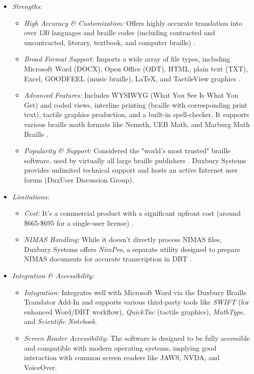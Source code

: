 \begin{itemize}
    \item \emph{Strengths:}
    \begin{itemize}
        \item \emph{High Accuracy \& Customization:} Offers highly accurate translation into over 130 languages and braille codes (including contracted and uncontracted, literary, textbook, and computer braille) \cite{DBTWebsite}.
        \item \emph{Broad Format Support:} Imports a wide array of file types, including Microsoft Word (DOCX), Open Office (ODT), HTML, plain text (TXT), Excel, GOODFEEL (music braille), LaTeX, and TactileView graphics \cite{VisionAidDBT}.
        \item \emph{Advanced Features:} Includes WYSIWYG (What You See Is What You Get) and coded views, interline printing (braille with corresponding print text), tactile graphics production, and a built-in spell-checker. It supports various braille math formats like Nemeth, UEB Math, and Marburg Math Braille \cite{DuxburySystems}.
        \item \emph{Popularity \& Support:} Considered the "world's most trusted" braille software, used by virtually all large braille publishers \cite{DuxburySystems}. Duxbury Systems provides unlimited technical support and hosts an active Internet user forum (DuxUser Discussion Group).
    \end{itemize}
    \item \emph{Limitations:}
    \begin{itemize}
        \item \emph{Cost:} It's a commercial product with a significant upfront cost (around \$665-\$695 for a single-user license) \cite{BlindHelpDBT}.
        \item \emph{NIMAS Handling:} While it doesn't directly process NIMAS files, Duxbury Systems offers \emph{NimPro}, a separate utility designed to prepare NIMAS documents for accurate transcription in DBT \cite{DuxburyProducts}.
    \end{itemize}
    \item \emph{Integration \& Accessibility:}
    \begin{itemize}
        \item \emph{Integration:} Integrates well with Microsoft Word via the Duxbury Braille Translator Add-In and supports various third-party tools like \emph{SWIFT} (for enhanced Word/DBT workflow), \emph{QuickTac} (tactile graphics), \emph{MathType}, and \emph{Scientific Notebook}.
        \item \emph{Screen Reader Accessibility:} The software is designed to be fully accessible and compatible with modern operating systems, implying good interaction with common screen readers like JAWS, NVDA, and VoiceOver.
    \end{itemize}
\end{itemize}

